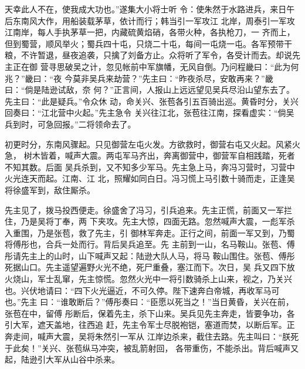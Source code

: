 \documentclass[UTF8,12pt,twoside,a4paper]{ctexart} %
\begin{document}
	\begin{flushleft}

\indent\setlength{\parindent}{2em}%
						\songti
						\hspace{1.6em}%
天幸此人不在，使我成大功也。”遂集大小将士听
令：使朱然于水路进兵，来日午后东南风大作，用船装载茅草，依计而行；韩当引一军攻江
北岸，周泰引一军攻江南岸，每人手执茅草一把，内藏硫黄焰硝，各带火种，各执枪刀，一
齐而上，但到蜀营，顺风举火；蜀兵四十屯，只烧二十屯，每间一屯烧一屯。各军预带干
粮，不许暂退，昼夜追袭，只擒了刘备方止。众将听了军令，各受计而去。却说先主正在御
营寻思破吴之计，忽见帐前中军旗幡，无风自倒。乃问程畿曰：“此为何兆？”畿曰：“夜
今莫非吴兵来劫营？”先主曰：“昨夜杀尽，安敢再来？”畿曰：“倘是陆逊试敌，奈
何？”正言间，人报山上远远望见吴兵尽沿山望东去了。先主曰：“此是疑兵。”令众休
动，命关兴、张苞各引五百骑出巡。黄昏时分，关兴回奏曰：“江北营中火起。”先主急令
关兴往江北，张苞往江南，探看虚实：“倘吴兵到时，可急回报。”二将领命去了。

初更时分，东南风骤起。只见御营左屯火发。方欲救时，御营右屯又火起。风紧火急，
树木皆着，喊声大震。两屯军马齐出，奔离御营中，御营军自相践踏，死者不知其数。后面
吴兵杀到，又不知多少军马。先主急上马，奔冯习营时，习营中火光连天而起。江南、江
北，照耀如同白日。冯习慌上马引数十骑而走，正逢吴将徐盛军到，敌住厮杀。

先主见了，拨马投西便走。徐盛舍了冯习，引兵追来。先主正慌，前面又一军拦住，乃是吴将丁奉，两
下夹攻。先主大惊，四面无路。忽然喊声大震，一彪军杀入重围，乃是张苞，救了先主，引
御林军奔走。正行之间，前面一军又到，乃蜀将傅彤也，合兵一处而行。背后吴兵追至。先
主前到一山，名马鞍山。张苞、傅彤请先主上的山时，山下喊声又起：陆逊大队人马，将马
鞍山围住。张苞、傅彤死据山口。先主遥望遍野火光不绝，死尸重叠，塞江而下。次日，吴
兵又四下放火烧山，军士乱窜，先主惊慌。忽然火光中一将引数骑杀上山来，视之，乃关兴
也。兴伏地请曰：“四下火光逼近，不可久停。陛下速奔白帝城，再收军马可也。”先主
曰：“谁敢断后？”傅彤奏曰：“臣愿以死当之！”当日黄昏，关兴在前，张苞在中，留傅
彤断后，保着先主，杀下山来。吴兵见先主奔走，皆要争功，各引大军，遮天盖地，往西追
赶，先主令军士尽脱袍铠，塞道而焚，以断后军。正奔走间，喊声大震，吴将朱然引一军从
江岸边杀来，截住去路。先主叫曰：“朕死于此矣！”关兴、张苞纵马冲突，被乱箭射回，
各带重伤，不能杀出。背后喊声又起，陆逊引大军从山谷中杀来。\cite{RN3,RN2} %


	\end{flushleft}%
\end{document}
